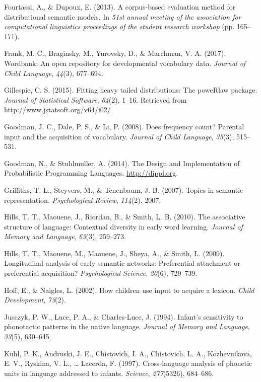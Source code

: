 \documentclass[english,floatsintext,man]{apa6}
\theoremstyle{definition}
\theoremstyle{definition}
\theoremstyle{definition}
\theoremstyle{remark}
\begin{document}
\hypertarget{ref-fourtassi2013}{}
Fourtassi, A., \& Dupoux, E. (2013). A corpus-based evaluation method
for distributional semantic models. In \emph{51st annual meeting of the
association for computational linguistics proceedings of the student
research workshop} (pp. 165--171).

\hypertarget{ref-frank2017}{}
Frank, M. C., Braginsky, M., Yurovsky, D., \& Marchman, V. A. (2017).
Wordbank: An open repository for developmental vocabulary data.
\emph{Journal of Child Language}, \emph{44}(3), 677--694.

\hypertarget{ref-gillespie15}{}
Gillespie, C. S. (2015). Fitting heavy tailed distributions: The
poweRlaw package. \emph{Journal of Statistical Software}, \emph{64}(2),
1--16. Retrieved from \url{http://www.jstatsoft.org/v64/i02/}

\hypertarget{ref-goodman2008}{}
Goodman, J. C., Dale, P. S., \& Li, P. (2008). Does frequency count?
Parental input and the acquisition of vocabulary. \emph{Journal of Child
Language}, \emph{35}(3), 515--531.

\hypertarget{ref-dippl}{}
Goodman, N., \& Stuhlmuller, A. (2014). The Design and Implementation of
Probabilistic Programming Languages. \url{http://dippl.org}.

\hypertarget{ref-griffiths07}{}
Griffiths, T. L., Steyvers, M., \& Tenenbaum, J. B. (2007). Topics in
semantic representation. \emph{Psychological Review}, \emph{114}(2),
2007.

\hypertarget{ref-hills2010}{}
Hills, T. T., Maouene, J., Riordan, B., \& Smith, L. B. (2010). The
associative structure of language: Contextual diversity in early word
learning. \emph{Journal of Memory and Language}, \emph{63}(3), 259--273.

\hypertarget{ref-hills2009}{}
Hills, T. T., Maouene, M., Maouene, J., Sheya, A., \& Smith, L. (2009).
Longitudinal analysis of early semantic networks: Preferential
attachment or preferential acquisition? \emph{Psychological Science},
\emph{20}(6), 729--739.

\hypertarget{ref-hoff2002}{}
Hoff, E., \& Naigles, L. (2002). How children use input to acquire a
lexicon. \emph{Child Development}, \emph{73}(2).

\hypertarget{ref-jusczyk1994}{}
Jusczyk, P. W., Luce, P. A., \& Charles-Luce, J. (1994). Infant's
sensitivity to phonotactic patterns in the native language.
\emph{Journal of Memory and Language}, \emph{33}(5), 630--645.

\hypertarget{ref-kuhl1997}{}
Kuhl, P. K., Andruski, J. E., Chistovich, I. A., Chistovich, L. A.,
Kozhevnikova, E. V., Ryskina, V. L., \ldots{} Lacerda, F. (1997).
Cross-language analysis of phonetic units in language addressed to
infants. \emph{Science}, \emph{277}(5326), 684--686.
\end{document}
